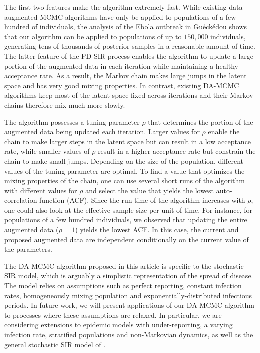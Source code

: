 \documentclass[11pt]{article}
\begin{document}
	The first two features make the algorithm extremely fast. While existing data-augmented MCMC algorithms have only be applied to populations of a few hundred of individuals, the analysis of the Ebola outbreak in Gu\'eck\'edou shows that our algorithm can be applied to populations of up to $150,000$ individuals, generating tens of thousands of posterior samples in a reasonable amount of time.	
	The latter feature of the PD-SIR process enables the algorithm to update a large portion of the augmented data in each iteration while maintaining a healthy acceptance rate. As a result, the Markov chain makes large jumps in the latent space and has very good mixing properties. In contrast, existing DA-MCMC algorithms keep most of the latent space fixed across iterations \cite{Gibson.1998, ONeill.1999, Fintzi.2017} and their Markov chains therefore mix much more slowly.
	
	The algorithm possesses a tuning parameter $\rho$ that determines the portion of the augmented data being updated each iteration. Larger values for $\rho$ enable the chain to make larger steps in the latent space but can result in a low acceptance rate, while smaller values of $\rho$ result in a higher acceptance rate but constrain the chain to make small jumps. Depending on the size of the population, different values of the tuning parameter are optimal. To find a value that optimizes the mixing properties of the chain, one can use several short runs of the algorithm with different values for $\rho$ and select the value that yields the lowest auto-correlation function (ACF). Since the run time of the algorithm increases with $\rho$, one could also look at the effective sample size per unit of time. For instance, for populations of a few hundred individuals, we observed that updating the entire augmented data ($\rho=1$) yields the lowest ACF. In this case, the current and proposed augmented data are independent conditionally on the current value of the parameters.
		
	The DA-MCMC algorithm proposed in this article is specific to the stochastic SIR model, which is arguably a simplistic representation of the spread of disease. The model relies on assumptions such as perfect reporting, constant infection rates, homogeneously mixing population and exponentially-distributed infectious periods. In future work, we will present applications of our DA-MCMC algorithm to processes where these assumptions are relaxed. In particular, we are considering extensions to epidemic models with under-reporting, a varying infection rate, stratified populations and non-Markovian dynamics, as well as the general stochastic SIR model of \cite{Severo.1969}.
			
\end{document}
